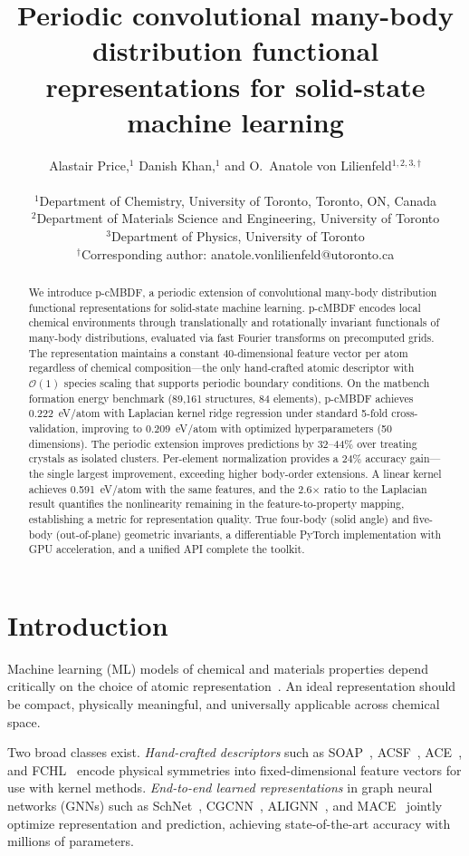 \documentclass[twocolumn]{article}
\title{Periodic convolutional many-body distribution functional representations for solid-state machine learning}
\author{
Alastair Price,$^{1}$ Danish Khan,$^{1}$ and O.~Anatole von Lilienfeld$^{1,2,3,\dagger}$ \\
\\
\small $^1$Department of Chemistry, University of Toronto, Toronto, ON, Canada \\
\small $^2$Department of Materials Science and Engineering, University of Toronto \\
\small $^3$Department of Physics, University of Toronto \\
\small $^\dagger$Corresponding author: anatole.vonlilienfeld@utoronto.ca
}
\date{}
\begin{document}
\maketitle

\begin{abstract}
We introduce p-cMBDF, a periodic extension of convolutional many-body distribution functional representations for solid-state machine learning.
p-cMBDF encodes local chemical environments through translationally and rotationally invariant functionals of many-body distributions, evaluated via fast Fourier transforms on precomputed grids.
The representation maintains a constant 40-dimensional feature vector per atom regardless of chemical composition---the only hand-crafted atomic descriptor with $\mathcal{O}(1)$ species scaling that supports periodic boundary conditions.
%
On the matbench formation energy benchmark (89,161 structures, 84 elements), p-cMBDF achieves 0.222~eV/atom with Laplacian kernel ridge regression under standard 5-fold cross-validation, improving to 0.209~eV/atom with optimized hyperparameters (50 dimensions).
The periodic extension improves predictions by 32--44\% over treating crystals as isolated clusters.
Per-element normalization provides a 24\% accuracy gain---the single largest improvement, exceeding higher body-order extensions.
%
A linear kernel achieves 0.591~eV/atom with the same features, and the 2.6$\times$ ratio to the Laplacian result quantifies the nonlinearity remaining in the feature-to-property mapping, establishing a metric for representation quality.
%
True four-body (solid angle) and five-body (out-of-plane) geometric invariants, a differentiable PyTorch implementation with GPU acceleration, and a unified API complete the toolkit.
\end{abstract}

\section{Introduction}

Machine learning (ML) models of chemical and materials properties depend critically on the choice of atomic representation~\cite{rupp2012,bartok2013,behler2007,vonlilienfeld2020}.
An ideal representation should be compact, physically meaningful, and universally applicable across chemical space.

Two broad classes exist.
\textit{Hand-crafted descriptors} such as SOAP~\cite{bartok2013}, ACSF~\cite{behler2007}, ACE~\cite{drautz2019}, and FCHL~\cite{faber2018,christensen2020} encode physical symmetries into fixed-dimensional feature vectors for use with kernel methods.
\textit{End-to-end learned representations} in graph neural networks (GNNs) such as SchNet~\cite{schutt2018}, CGCNN~\cite{xie2018}, ALIGNN~\cite{choudhary2021}, and MACE~\cite{batatia2022} jointly optimize representation and prediction, achieving state-of-the-art accuracy with millions of parameters.
\end{document}

